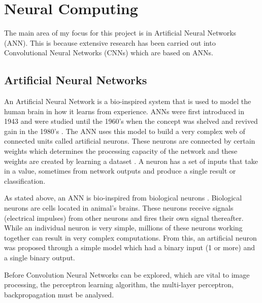 \section{Neural Computing}
The main area of my focus for this project is in
Artificial Neural Networks (ANN). This is because extensive research has been carried out into Convolutional Neural Networks (CNNs) which are based on ANNs.
\subsection*{Artificial Neural Networks}
An Artificial Neural Network is a bio-inspired system that is used to model the human brain in how it learns from experience.
ANNs were first introduced in 1943 and were studied until the 1960's when the concept was shelved and revived gain in the 1980's \parencite{handsOnML}.
The ANN uses this model to build a very complex web of connected units called
artificial neurons.
These neurons are connected by certain weights which determines the processing
capacity of the network and these weights are created by learning a
dataset \parencite{malachy}.
A neuron has a set of inputs that take in a value, sometimes from network outputs
and produce a single result or classification.

As stated above, an ANN is bio-inspired from biological neurons \parencite{handsOnML}.
Biological neurons are cells located in animal's brains.
These neurons receive signals (electrical impulses) from other neurons and fires their own signal thereafter.
While an individual neuron is very simple, millions of these neurons working together can result in very complex computations.
From this, an artificial neuron was proposed through a simple model which had a binary input (1 or more) and a single binary output.


Before Convolution Neural Networks can be explored, which are vital to image
processing, the perceptron learning algorithm, the multi-layer perceptron, backpropagation must be analysed.




